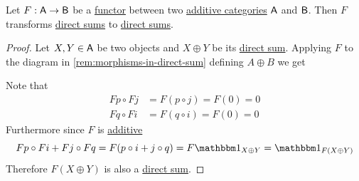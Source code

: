 \documentclass[../../../main]{subfiles}
\begin{document}
\begin{lemma}\label{lemma:additive-functor-preserves-sum}
  Let \(F: \mathsf{A} \to \mathsf{B}\) be a \hyperref[def:functor]{functor} between two \hyperref[def:additive-category]{additive categories} \(\mathsf{A}\) and \(\mathsf{B}\).
  Then \(F\) transforms \hyperref[def:direct-sum]{direct sums} to \hyperref[def:direct-sum]{direct sums}.
\end{lemma}
\begin{proof}
  Let \(X, Y \in \mathsf{A}\) be two objects and \(X \oplus Y\) be its \hyperref[def:direct-sum]{direct sum}.
  Applying \(F\) to the diagram in \autoref{rem:morphisms-in-direct-sum} defining \(A \oplus B\) we get
  \begin{center}
  \end{center}
  Note that
  \begin{align*}
    Fp \circ Fj &= F(p \circ j) = F(0) = 0 \\
    Fq \circ Fi &= F(q \circ i) = F(0) = 0
  \end{align*}
  Furthermore since \(F\) is \hyperref[def:additive-functor]{additive}
  \begin{equation*}
    Fp \circ Fi + Fj \circ Fq = F(p \circ i + j \circ q) = F\id_{X \oplus Y} = \id_{F(X \oplus Y)}
  \end{equation*}
  Therefore \(F(X \oplus Y)\) is also a \hyperref[def:direct-sum]{direct sum}.
\end{proof}
\end{document}
